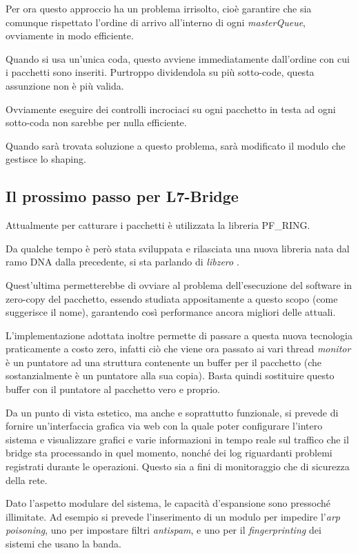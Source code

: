 Per ora questo approccio ha un problema irrisolto, cioè garantire che sia comunque rispettato l'ordine di arrivo all'interno di ogni \emph{masterQueue}, ovviamente in modo efficiente.

Quando si usa un'unica coda, questo avviene immediatamente dall'ordine con cui i pacchetti sono inseriti. Purtroppo dividendola su più sotto-code, questa assunzione non è più valida.

Ovviamente eseguire dei controlli incrociaci su ogni pacchetto in testa ad ogni sotto-coda non sarebbe per nulla efficiente.

Quando sarà trovata soluzione a questo problema, sarà modificato il modulo che gestisce lo shaping.

\subsection{Il prossimo passo per L7-Bridge}

Attualmente per catturare i pacchetti è utilizzata la libreria PF\_RING.

Da qualche tempo è però stata sviluppata e rilasciata una nuova libreria nata dal ramo DNA dalla precedente, si sta parlando di \emph{libzero} \cite{libzero}.

Quest'ultima permetterebbe di ovviare al problema dell'esecuzione del software in zero-copy del pacchetto, essendo studiata appositamente a questo scopo (come suggerisce il nome), garantendo così performance ancora migliori delle attuali.

L'implementazione adottata inoltre permette di passare a questa nuova tecnologia praticamente a costo zero, infatti ciò che viene ora passato ai vari thread \emph{monitor} è un puntatore ad una struttura contenente un buffer per il pacchetto (che sostanzialmente è un puntatore alla sua copia). Basta quindi sostituire questo buffer con il puntatore al pacchetto vero e proprio.

Da un punto di vista estetico, ma anche e soprattutto funzionale, si prevede di fornire un'interfaccia grafica via web con la quale poter configurare l'intero sistema e visualizzare grafici e varie informazioni in tempo reale sul traffico che il bridge sta processando in quel momento, nonché dei log riguardanti problemi registrati durante le operazioni. Questo sia a fini di monitoraggio che di sicurezza della rete.

Dato l'aspetto modulare del sistema, le capacità d'espansione sono pressoché illimitate. Ad esempio si prevede l'inserimento di un modulo per impedire l'\emph{arp poisoning}, uno per impostare filtri \emph{antispam}, e uno per il \emph{fingerprinting} dei sistemi che usano la banda.

